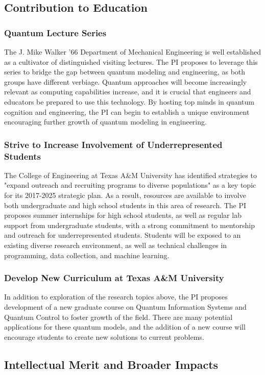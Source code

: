 \subsection{Contribution to Education}
\subsubsection{Quantum Lecture Series}
The J. Mike Walker '66 Department of Mechanical Engineering is well established as a cultivator of distinguished visiting lectures. The PI proposes to leverage this series to bridge the gap between quantum modeling and engineering, as both groups have different verbiage. Quantum approaches will become increasingly relevant as computing capabilities increase, and it is crucial that engineers and educators be prepared to use this technology. By hosting top minds in quantum cognition and engineering, the PI can begin to establish a unique environment encouraging further growth of quantum modeling in engineering.
\subsubsection{Strive to Increase Involvement of Underrepresented Students}
The College of Engineering at Texas A\&M University has identified strategies to "expand outreach and recruiting programs to diverse populations" as a key topic for its 2017-2025 strategic plan. As a result, resources are available to involve both undergraduate and high school students in this area of research. The PI proposes summer internships for high school students, as well as regular lab support from undergraduate students, with a strong commitment to mentorship and outreach for underrepresented students. Students will be exposed to an existing diverse research environment, as well as technical challenges in programming, data collection, and machine learning.
\subsubsection{Develop New Curriculum at Texas A\&M University}
In addition to exploration of the research topics above, the PI proposes development of a new graduate course on Quantum Information Systems and Quantum Control to foster growth of the field. There are many potential applications for these quantum models, and the addition of a new course will encourage students to create new solutions to current problems. 
\subsection{Intellectual Merit and Broader Impacts}
